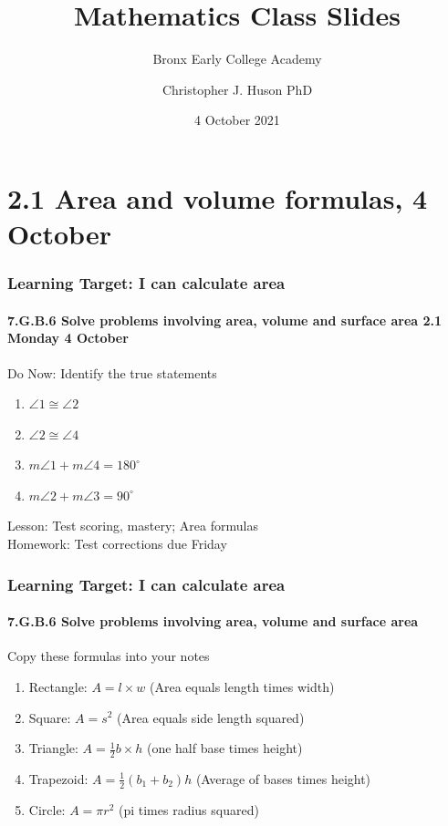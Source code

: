 \documentclass{beamer}
\title{Mathematics Class Slides}
\subtitle{Bronx Early College Academy}
\author{Christopher J. Huson PhD}
\date{4 October 2021}
\begin{document}
\frame{\titlepage}
\section[Outline]{}
\frame{\tableofcontents}

\section{2.1 Area and volume formulas, 4 October}
\frame
{
  \frametitle{Learning Target: I can calculate area}
  \framesubtitle{7.G.B.6 Solve problems involving area, volume and surface area \hfill \alert{2.1 Monday 4 October}}
  \begin{block}{Do Now: Identify the true statements}
    \begin{multicols}{2}
    \begin{enumerate}
      \item $\angle 1 \cong \angle 2$
      \item $\angle 2 \cong \angle 4$
      \item $m\angle 1 + m\angle 4=180^\circ$
      \item $m\angle 2 + m\angle 3=90^\circ$
  \end{enumerate}
  \begin{center}
  \end{center}
\end{multicols}
\end{block}
  Lesson: Test scoring, mastery; Area formulas \\[0.25cm]
  Homework: Test corrections due Friday
}

\frame
{
  \frametitle{Learning Target:  I can calculate area}
  \framesubtitle{7.G.B.6 Solve problems involving area, volume and surface area}

  \begin{block}{Copy these formulas into your notes}
    
    \begin{enumerate}
    \item Rectangle: $A=l \times w$ (Area equals length times width)
    \item Square: $A=s^2$ (Area equals side length squared)
    \item Triangle: $A=\frac{1}{2} b \times h$ (one half base times height)
    \item Trapezoid: $A=\frac{1}{2} (b_1 +b_2) h$ (Average of bases times height)
    \item Circle: $A=\pi r^2$ (pi times radius squared)
    \end{enumerate}
  \end{block}
}
\end{document}
